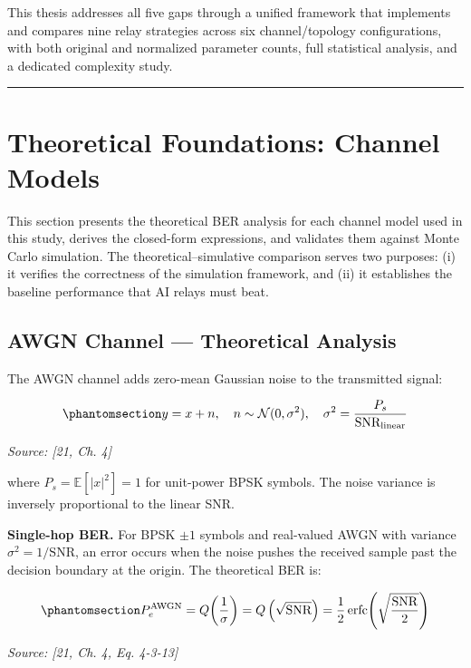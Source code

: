 This thesis addresses all five gaps through a unified framework that implements and compares nine relay strategies across six channel/topology configurations, with both original and normalized parameter counts, full statistical analysis, and a dedicated complexity study.

\begin{center}\rule{0.5\linewidth}{0.5pt}\end{center}

\section{Theoretical Foundations: Channel Models}\label{sec:theoretical-foundations-channel-models}

This section presents the theoretical BER analysis for each channel model used in this study, derives the closed-form expressions, and validates them against Monte Carlo simulation. The theoretical--simulative comparison serves two purposes: (i) it verifies the correctness of the simulation framework, and (ii) it establishes the baseline performance that AI relays must beat.

\subsection{AWGN Channel --- Theoretical Analysis}\label{sec:awgn-channel-theoretical-analysis}

The AWGN channel adds zero-mean Gaussian noise to the transmitted signal:

\begin{equation}\protect\phantomsection\label{eq:awgn-channel}{y = x + n, \quad n \sim \mathcal{N}(0, \sigma^2), \quad \sigma^2 = \frac{P_s}{\text{SNR}_{\text{linear}}}
}\end{equation} \par{\small\textit{Source: [21, Ch. 4]}}

where \(P_s = \mathbb{E}[|x|^2] = 1\) for unit-power BPSK symbols. The noise variance is inversely proportional to the linear SNR.

\textbf{Single-hop BER.} For BPSK \(\pm 1\) symbols and real-valued AWGN with variance \(\sigma^2 = 1/\text{SNR}\), an error occurs when the noise pushes the received sample past the decision boundary at the origin. The theoretical BER is:

\begin{equation}\protect\phantomsection\label{eq:awgn-ber}{P_e^{\text{AWGN}} = Q\!\left(\frac{1}{\sigma}\right) = Q\left(\sqrt{\text{SNR}}\right) = \frac{1}{2}\,\text{erfc}\!\left(\sqrt{\frac{\text{SNR}}{2}}\right)
}\end{equation} \par{\small\textit{Source: [21, Ch. 4, Eq. 4-3-13]}}

